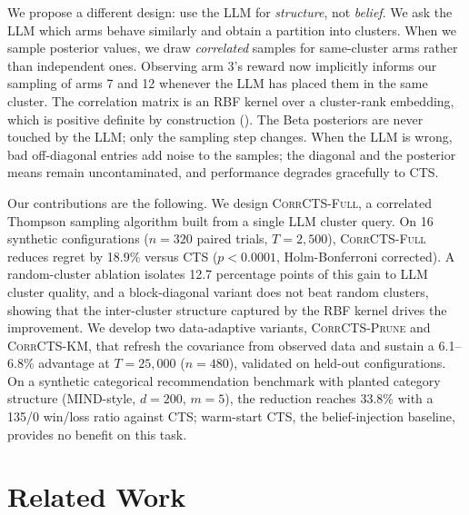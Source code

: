 \documentclass{article}
\theoremstyle{plain}
\theoremstyle{definition}
\theoremstyle{remark}
\newcommand{\CorrFull}{\textsc{CorrCTS-Full}}
\newcommand{\EdgePrune}{\textsc{CorrCTS-Prune}}
\newcommand{\KMRefine}{\textsc{CorrCTS-KM}}
\begin{document}
We propose a different design: use the LLM for \emph{structure}, not \emph{belief}.
We ask the LLM which arms behave similarly and obtain a partition into clusters.
When we sample posterior values, we draw \emph{correlated} samples for same-cluster arms rather than independent ones.
Observing arm 3's reward now implicitly informs our sampling of arms 7 and 12 whenever the LLM has placed them in the same cluster.
The correlation matrix is an RBF kernel over a cluster-rank embedding, which is positive definite by construction ().
The Beta posteriors are never touched by the LLM; only the sampling step changes.
When the LLM is wrong, bad off-diagonal entries add noise to the samples; the diagonal and the posterior means remain uncontaminated, and performance degrades gracefully to CTS.

Our contributions are the following.
We design \CorrFull{}, a correlated Thompson sampling algorithm built from a single LLM cluster query.
On 16 synthetic configurations ($n{=}320$ paired trials, $T{=}2{,}500$), \CorrFull{} reduces regret by 18.9\% versus CTS ($p < 0.0001$, Holm-Bonferroni corrected).
A random-cluster ablation isolates 12.7 percentage points of this gain to LLM cluster quality, and a block-diagonal variant does not beat random clusters, showing that the inter-cluster structure captured by the RBF kernel drives the improvement.
We develop two data-adaptive variants, \EdgePrune{} and \KMRefine{}, that refresh the covariance from observed data and sustain a 6.1--6.8\% advantage at $T{=}25{,}000$ ($n{=}480$), validated on held-out configurations.
On a synthetic categorical recommendation benchmark with planted category structure (MIND-style, $d{=}200$, $m{=}5$), the reduction reaches 33.8\% with a 135/0 win/loss ratio against CTS; warm-start CTS, the belief-injection baseline, provides no benefit on this task.

\section{Related Work}\label{sec:related}
\end{document}
